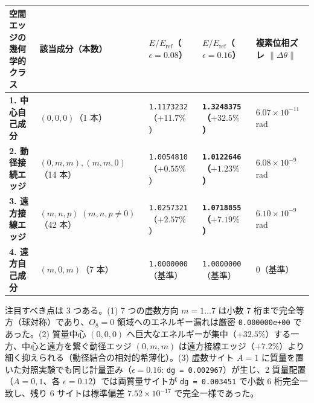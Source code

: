 \documentclass[
  a4paper,
]{ltjsarticle}
\newcounter{none} %
\begin{document}
{\def\LTcaptype{none} %
\begin{longtable}[]{@{}
  >{\raggedright\arraybackslash}p{}
  >{\raggedright\arraybackslash}p{}
  >{\centering\arraybackslash}p{}
  >{\centering\arraybackslash}p{}
  >{\centering\arraybackslash}p{}@{}}
\toprule\noalign{}
\begin{minipage}[b]{\linewidth}\raggedright
空間エッジの幾何学的クラス
\end{minipage} & \begin{minipage}[b]{\linewidth}\raggedright
該当成分（本数）
\end{minipage} & \begin{minipage}[b]{\linewidth}\centering
\(E/E_{\mathrm{ref}}\)（\(\epsilon=0.08\)）
\end{minipage} & \begin{minipage}[b]{\linewidth}\centering
\(E/E_{\mathrm{ref}}\)（\(\epsilon=0.16\)）
\end{minipage} & \begin{minipage}[b]{\linewidth}\centering
複素位相ズレ \(\|\Delta\theta\|\)
\end{minipage} \\
\midrule\noalign{}
\endhead
\bottomrule\noalign{}
\endlastfoot
\textbf{1. 中心自己成分} & \((0, 0, 0)\)（1 本） &
\texttt{1.1173232}（\(+11.7\%\)） &
\textbf{\texttt{1.3248375}（\(+32.5\%\)）} & \(6.07 \times 10^{-11}\)
rad \\
\textbf{2. 動径接続エッジ} & \((0, m, m), (m, m, 0)\)（14 本） &
\texttt{1.0054810}（\(+0.55\%\)） &
\textbf{\texttt{1.0122646}（\(+1.23\%\)）} & \(6.08 \times 10^{-9}\)
rad \\
\textbf{3. 遠方接線エッジ} & \((m, n, p)\; (m,n,p\neq 0)\)（42 本） &
\texttt{1.0257321}（\(+2.57\%\)） &
\textbf{\texttt{1.0718855}（\(+7.19\%\)）} & \(6.10 \times 10^{-9}\)
rad \\
\textbf{4. 遠方自己成分} & \((m, 0, m)\)（7 本） &
\texttt{1.0000000}（基準） & \texttt{1.0000000}（基準） &
\(0\)（基準） \\
\end{longtable}
}

注目すべき点は 3 つある。(1) 7 つの虚数方向 \(m = 1 \dots 7\) は小数 7
桁まで完全等方（球対称）であり、\(O_8 = 0\) 領域へのエネルギー漏れは厳密
\texttt{0.000000e+00} であった。(2) 質量中心 \((0,0,0)\)
へ巨大なエネルギーが集中（\(+32.5\%\)）する一方、中心と遠方を繋ぐ動径エッジ
\((0,m,m)\)
は遠方接線エッジ（\(+7.2\%\)）より細く抑えられる（動径結合の相対的希薄化）。(3)
虚数サイト \(A = 1\)
に質量を置いた対照実験でも同じ計量歪み（\(\epsilon = 0.16\):
\texttt{dg\ =\ 0.002967}）が生じ、2 質量配置（\(A = 0, 1\)、各
\(\epsilon = 0.12\)）では両質量サイトが \texttt{dg\ =\ 0.003451} で小数
6 桁完全一致し、残り 6 サイトは標準偏差 \(7.52 \times 10^{-17}\)
で完全一様であった。
\end{document}
